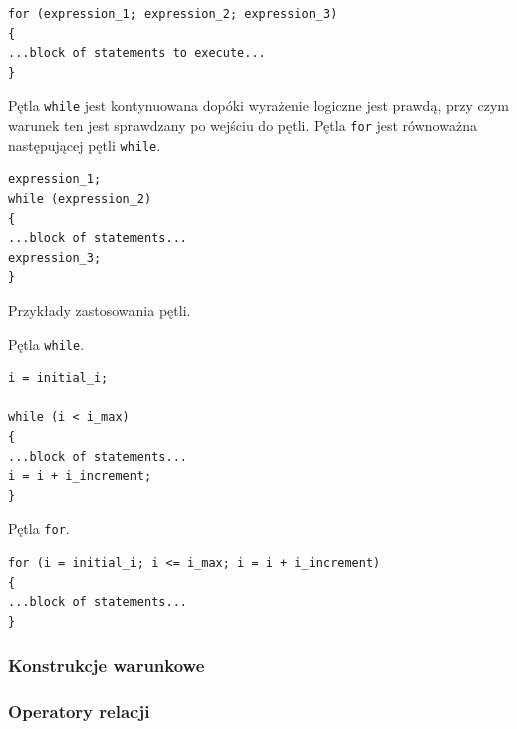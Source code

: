\begin{lstlisting}[style=MyCStyle]
for (expression_1; expression_2; expression_3)
{
...block of statements to execute...
}
\end{lstlisting}

Pętla \lstinline[style=MyCStyle]{while} jest kontynuowana dopóki wyrażenie logiczne jest prawdą, przy czym warunek ten jest sprawdzany po wejściu do pętli. Pętla \lstinline[style=MyCStyle]{for} jest równoważna następującej pętli \lstinline[style=MyCStyle]{while}.

\begin{lstlisting}[style=MyCStyle]
expression_1;
while (expression_2)
{
...block of statements...
expression_3;
}
\end{lstlisting}

Przykłady zastosowania pętli.

\begin{myitemize}
\item Pętla \lstinline[style=MyCStyle]{while}.
\end{myitemize}

\begin{lstlisting}[style=MyCStyle]
i = initial_i;

while (i < i_max)
{
...block of statements...
i = i + i_increment;
}
\end{lstlisting}

\begin{myitemize}
\item Pętla \lstinline[style=MyCStyle]{for}.
\end{myitemize}

\begin{lstlisting}[style=MyCStyle,caption=Pętla for - przykład]
for (i = initial_i; i <= i_max; i = i + i_increment)
{
...block of statements...
}
\end{lstlisting}


\subsubsection{Konstrukcje warunkowe}

\subsubsection{Operatory relacji}

